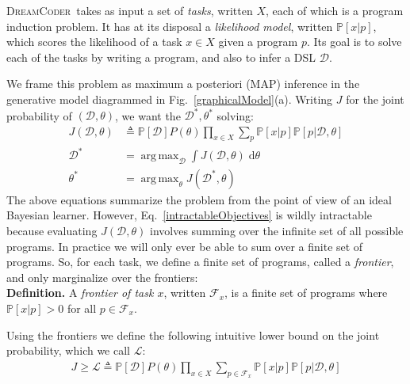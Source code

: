 \documentclass{article}
\newcommand{\system}{\textsc{DreamCoder}~}
\newcommand{\lowerBound}{\mathscr{L}}
\DeclareMathOperator*{\argmax}{arg\,max} %
\newcommand{\probability}{\mathds{P}} %
\begin{document}
\system takes as input a set of \emph{tasks}, written $X$, each of which is a program induction problem.
It has at its disposal a \emph{likelihood model}, written $\probability[x|p]$, which scores the likelihood of a task $x\in X$ given a program $p$.
Its goal is to solve each of the tasks by writing a program,
and also to infer a DSL $\mathcal{D}$.

We frame this problem as maximum a posteriori (MAP) inference in the generative model diagrammed in Fig.~\ref{graphicalModel}(a). Writing $J$ for the joint probability of $(\mathcal{D},\theta)$, we want the $\mathcal{D}^*,\theta^*$ solving:
\begin{align}\label{intractableObjectives}
\nonumber  J(\mathcal{D},\theta)&\triangleq \probability[\mathcal{D}]P(\theta)\prod_{x\in X} \sum_p \probability[x|p]\probability[p|\mathcal{D},\theta]\\
  \mathcal{D}^* &= \argmax_{\mathcal{D}}\int J(\mathcal{D},\theta)\;\mathrm{d}\theta \\
\nonumber  \theta^*& =\argmax_\theta J(\mathcal{D}^*,\theta)
\end{align}
The above equations summarize the problem from the point of view of an ideal Bayesian learner.
However, Eq.~\ref{intractableObjectives}
is wildly intractable because evaluating $J(\mathcal{D},\theta)$ involves
summing over the  infinite set of all possible programs.
In practice we will only ever be able to sum over a finite set of programs.
So, for each task, we define a finite set of programs, called a \emph{frontier}, and only marginalize over the frontiers:
\\\noindent\textbf{Definition.} A \emph{frontier of task $x$}, written $\mathcal{F}_x$,
is a finite set of programs where $\probability[x|p] > 0$ for all $p\in \mathcal{F}_x$.

Using the frontiers we  define the following intuitive lower bound on the joint probability, which we call $\lowerBound$:
\begin{align}
 J\geq \lowerBound\triangleq\probability[\mathcal{D}]P(\theta)\prod_{x\in X} \sum_{p\in \mathcal{F}_x} \probability[x|p]\probability[p|\mathcal{D},\theta]
\end{align}

\end{document}
